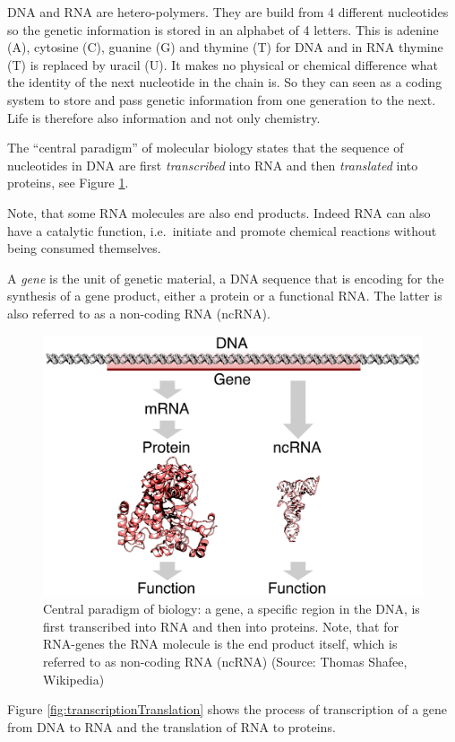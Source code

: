 \documentclass[
  11pt,
]{book}
\begin{document}
DNA and RNA are hetero-polymers. They are build from 4 different nucleotides so the genetic information is stored in an alphabet of 4 letters. This is
adenine (A), cytosine (C), guanine (G) and thymine (T) for DNA and in RNA thymine (T) is replaced by uracil (U).
It makes no physical or chemical difference what the identity of the next nucleotide in the chain is. So they can seen as a coding system to store and pass genetic information from one generation to the next. Life is therefore also information and not only chemistry.

The ``central paradigm'' of molecular biology states that the sequence of nucleotides in DNA are first \emph{transcribed} into RNA and then \emph{translated} into proteins, see Figure \ref{fig:centralParadigm}.

Note, that some RNA molecules are also end products. Indeed RNA can also have a catalytic function, i.e.~initiate and promote chemical reactions without being consumed themselves.

A \emph{gene} is the unit of genetic material, a DNA sequence that is encoding for the synthesis of a gene product, either a protein or a functional RNA. The latter is also referred to as a non-coding RNA (ncRNA).

\begin{figure}

{\centering \includegraphics[width=0.5\linewidth]{./figs/gene} 

}

\caption{Central paradigm of biology: a gene, a specific region in the DNA, is first transcribed into RNA and then into proteins. Note, that for RNA-genes the RNA molecule is the end product itself, which is referred to as non-coding RNA (ncRNA) (Source: Thomas Shafee, Wikipedia)}\label{fig:centralParadigm}
\end{figure}

Figure \ref{fig:transcriptionTranslation} shows the process of transcription of a gene from DNA to RNA and the translation of RNA to proteins.
\end{document}
